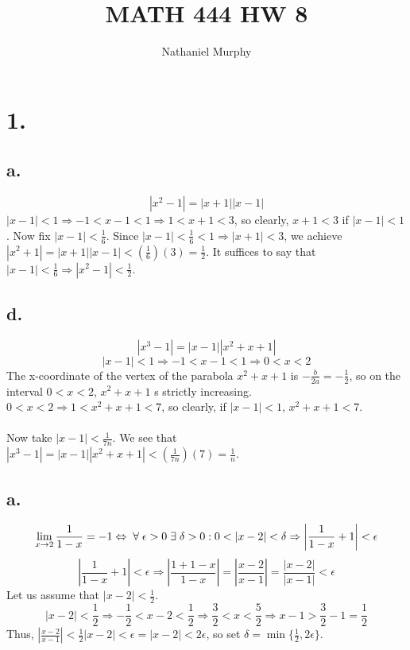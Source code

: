 \documentclass[11pt]{article}
\title{\textbf{MATH 444 HW 8}}
\author{Nathaniel Murphy}
\date{}
\begin{document}
\maketitle

\section*{1.}
\subsection*{a.}
\[|x^2-1|=|x+1||x-1|\]
$|x-1|<1\Rightarrow -1 < x-1 < 1 \Rightarrow 1 < x+1 < 3$, so clearly, $x+1 < 3$ if $|x-1| < 1$. Now fix $|x-1| < \frac{1}{6}$. Since $|x-1| < \frac{1}{6} < 1 \Rightarrow |x+1| < 3$, we achieve $|x^2+1| = |x+1||x-1| < \left(\frac{1}{6}\right)(3) = \frac{1}{2}$. It suffices to say that $|x-1| < \frac{1}{6} \Rightarrow |x^2-1| < \frac{1}{2}$.

\subsection*{d.}
\[|x^3-1| = |x-1||x^2+x+1|\]
\[|x-1| < 1 \Rightarrow -1 < x-1 < 1 \Rightarrow 0 < x < 2\]
The x-coordinate of the vertex of the parabola $x^2+x+1$ is $-\frac{b}{2a}=-\frac{1}{2}$, so on the interval $0<x<2$, $x^2 + x + 1$ s strictly increasing. \\
$0<x<2 \Rightarrow 1 < x^2+x+1 < 7$, so clearly, if $|x-1|<1$, $x^2+x+1<7$. \\
\\
Now take $|x-1| < \frac{1}{7n}$. We see that $|x^3-1|=|x-1||x^2+x+1|< \left(\frac{1}{7n}\right)(7)=\frac{1}{n}$.

\subsection*{a.}
\[\lim_{x\to2} \frac{1}{1-x}=-1\Leftrightarrow \hspace{1mm} \forall\hspace{1mm}\epsilon > 0 \hspace{1mm} \exists\hspace{1mm}\delta>0: 0 < |x-2| < \delta \Rightarrow \left|\frac{1}{1-x}+1\right|<\epsilon\]
\[\left|\frac{1}{1-x}+1\right|< \epsilon \Rightarrow \left|\frac{1+1-x}{1-x}\right|=\left|\frac{x-2}{x-1}\right|=\frac{|x-2|}{|x-1|} < \epsilon\]
Let us assume that $|x-2| < \frac{1}{2}$.
\[|x-2| < \frac{1}{2} \Rightarrow -\frac{1}{2} < x-2 < \frac{1}{2} \Rightarrow \frac{3}{2} < x < \frac{5}{2} \Rightarrow x-1 > \frac{3}{2} - 1 = \frac{1}{2}\]
Thus, $\left|\frac{x-2}{x-1}\right| < \frac{1}{2}|x-2|< \epsilon = |x-2| < 2\epsilon$, so set $\delta = \min\{\frac{1}{2},2\epsilon\}$.
\end{document}
